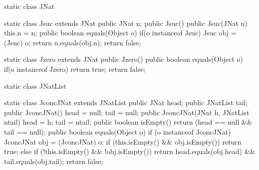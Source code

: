 \begin{tomcode3}[label=code:implementationJPeano,caption=Implémentation Java utilisée]
static class JNat { }

static class Jsuc extends JNat {
  public JNat n;
  public Jsuc() { }
  public Jsuc(JNat n) { this.n = n; }
  public boolean equals(Object o) {
    if(o instanceof Jsuc) {
      Jsuc obj = (Jsuc) o;
      return n.equals(obj.n);
    }
    return false;
  }
} 

static class Jzero extends JNat {
  public Jzero() {}
  public boolean equals(Object o) {
    if(o instanceof Jzero) {
      return true;
    }
    return false;
  }
}

static class JNatList { }

static class JconcJNat extends JNatList {
  public JNat head;
  public JNatList tail;
  public JconcJNat() { head = null; tail = null; }
  public JconcJNat(JNat h, JNatList ntail) {
    head = h;
    tail = ntail;
  }
  public boolean isEmpty() {
    return (head == null && tail == null);
  }
  public boolean equals(Object o) {
    if (o instanceof JconcJNat) {
      JconcJNat obj = (JconcJNat) o;
      if (this.isEmpty() && obj.isEmpty()) {
        return true;
      } else if (!this.isEmpty() && !obj.isEmpty()) {
        return 
          head.equals(obj.head) && tail.equals(obj.tail);
      }
    }
    return false;
  }
}
\end{tomcode3}
